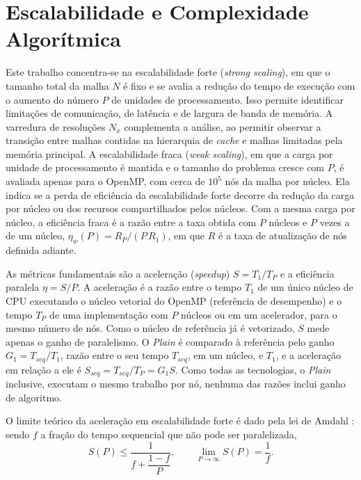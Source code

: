 
\section{Escalabilidade e Complexidade Algorítmica}\label{sec:escalabilidade-e-complexidade}

Este trabalho concentra-se na escalabilidade forte (\textit{strong scaling}), em que o tamanho total da malha $N$ é fixo e se avalia a redução do tempo de execução com o aumento do número $P$ de unidades de processamento.
Isso permite identificar limitações de comunicação, de latência e de largura de banda de memória.
A varredura de resoluções $N_x$ complementa a análise, ao permitir observar a transição entre malhas contidas na hierarquia de \textit{cache} e malhas limitadas pela memória principal.
A escalabilidade fraca (\textit{weak scaling}), em que a carga por unidade de processamento é mantida e o tamanho do problema cresce com $P$, é avaliada apenas para o OpenMP, com cerca de $10^5$ nós da malha por núcleo.
Ela indica se a perda de eficiência da escalabilidade forte decorre da redução da carga por núcleo ou dos recursos compartilhados pelos núcleos.
Com a mesma carga por núcleo, a eficiência fraca é a razão entre a taxa obtida com $P$ núcleos e $P$ vezes a de um núcleo, $\eta_w(P) = R_P/(P\,R_1)$, em que $R$ é a taxa de atualização de nós definida adiante.

As métricas fundamentais são a aceleração (\textit{speedup}) $S = T_1 / T_P$ e a eficiência paralela $\eta = S / P$.
A aceleração é a razão entre o tempo $T_1$ de um único núcleo de CPU executando o núcleo vetorial do OpenMP (referência de desempenho) e o tempo $T_P$ de uma implementação com $P$ núcleos ou em um acelerador, para o mesmo número de nós.
Como o núcleo de referência já é vetorizado, $S$ mede apenas o ganho de paralelismo.
O \textit{Plain} é comparado à referência pelo ganho $G_1 = T_{seq} / T_1$, razão entre o seu tempo $T_{seq}$, em um núcleo, e $T_1$, e a aceleração em relação a ele é $S_{seq} = T_{seq} / T_P = G_1 S$.
Como todas as tecnologias, o \textit{Plain} inclusive, executam o mesmo trabalho por nó, nenhuma das razões inclui ganho de algoritmo.

O limite teórico da aceleração em escalabilidade forte é dado pela lei de Amdahl \parencite{Amdahl1967}: sendo $f$ a fração do tempo sequencial que não pode ser paralelizada,
\[
S(P) \le \frac{1}{f + \dfrac{1-f}{P}},
\qquad
\lim_{P\to\infty} S(P) = \frac{1}{f}.
\]


